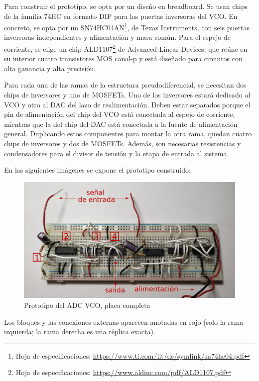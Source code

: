 \documentclass[12pt]{report} %
\begin{document}
	Para construir el prototipo, se opta por un diseño en breadboard. Se usan chips de la familia 74HC en formato DIP para las puertas inversoras del VCO. En concreto, se opta por un SN74HC04AN\footnote{Hoja de especificaciones: \url{https://www.ti.com/lit/ds/symlink/sn74hc04.pdf}}, de Texas Instruments, con seis puertas inversoras independientes y alimentación y masa común. Para el espejo de corriente, se elige un chip ALD1107\footnote{Hoja de especificaciones: \url{https://www.aldinc.com/pdf/ALD1107.pdf}} de Advanced Linear Devices, que reúne en su interior cuatro transistores MOS canal-p y está diseñado para circuitos con alta ganancia y alta precisión.
	
	Para cada una de las ramas de la estructura pseudodiferencial, se necesitan dos chips de inversores y uno de MOSFETs. Uno de los inversores estará dedicado al VCO y otro al DAC del lazo de realimentación. Deben estar separados porque el pin de alimentación del chip del VCO está conectada al espejo de corriente, mientras que la del chip del DAC está conectada a la fuente de alimentación general. Duplicando estos componentes para montar la otra rama, quedan cuatro chips de inversores y dos de MOSFETs. Además, son necesarias resistencias y condensadores para el divisor de tensión y la etapa de entrada al sistema.
	
	En las siguientes imágenes se expone el prototipo construido:
	
	\begin{figure}[H]
		\includegraphics[width=\textwidth]{proto-pcb-whole-annotated.png}
		\caption[Prototipo del ADC VCO, placa completa]{Prototipo del ADC VCO, placa completa}
		\label{fig:proto-pcb-whole-annotated.png}
	\end{figure}

	Los bloques y las conexiones externas aparecen anotadas en rojo (solo la rama izquierda; la rama derecha es una réplica exacta).
	
\end{document}
